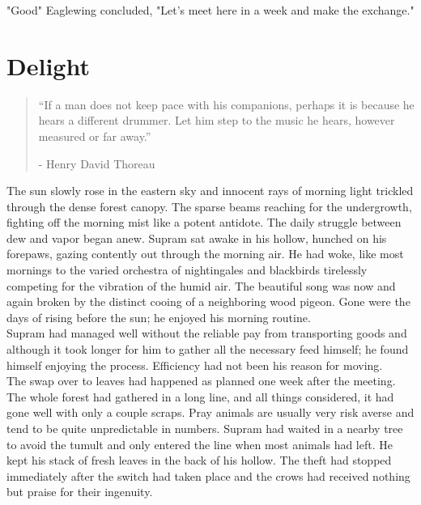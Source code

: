 \documentclass[smalldemyvopaper,11pt,twoside,onecolumn,openright,extrafontsizes]{memoir}
\begin{document}
"Good" Eaglewing concluded, "Let's meet here in a week and make the exchange."


\chapter{Delight}

\vspace{-1.3cm}
\begin{localsize}{10}
	\begin{quote}
		“If a man does not keep pace with his companions, perhaps it is because he hears a different drummer. Let him step to the music he hears, however measured or far away.”
		\begin{flushright}- Henry David Thoreau \end{flushright}
	\end{quote} 
\end{localsize}
\vspace{1cm}

The sun slowly rose in the eastern sky and innocent rays of morning light trickled through the dense forest canopy. The sparse beams reaching for the undergrowth, fighting off the morning mist like a potent antidote. The daily struggle between dew and vapor began anew. Supram sat awake in his hollow, hunched on his forepaws, gazing contently out through the morning air. He had woke, like most mornings to the varied orchestra of nightingales and blackbirds tirelessly competing for the vibration of the humid air. The beautiful song was now and again broken by the distinct cooing of a neighboring wood pigeon. Gone were the days of rising before the sun; he enjoyed his morning routine.\\

Supram had managed well without the reliable pay from transporting goods and although it took longer for him to gather all the necessary feed himself; he found himself enjoying the process. Efficiency had not been his reason for moving.\\

The swap over to leaves had happened as planned one week after the meeting. The whole forest had gathered in a long line, and all things considered, it had gone well with only a couple scraps. Pray animals are usually very risk averse and tend to be quite unpredictable in numbers. Supram had waited in a nearby tree to avoid the tumult and only entered the line when most animals had left. He kept his stack of fresh leaves in the back of his hollow. The theft had stopped immediately after the switch had taken place and the crows had received nothing but praise for their ingenuity.\\
\end{document}
